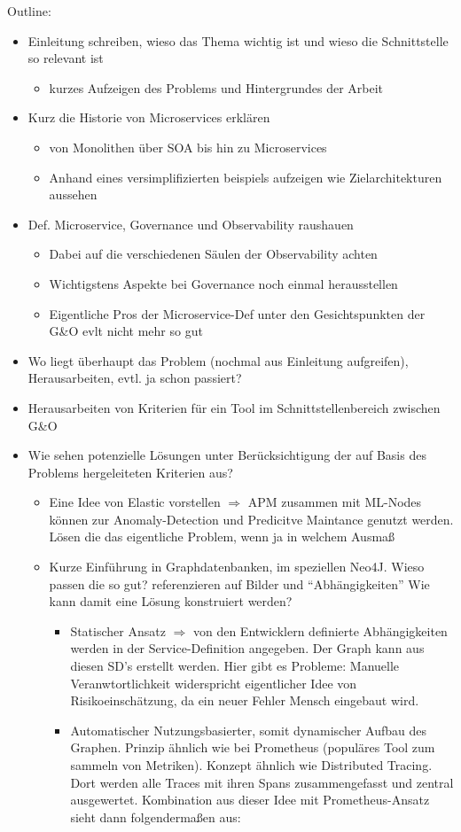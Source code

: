 \documentclass[
	12pt,
	BCOR=5mm,
	DIV=12,
	headinclude=on,
	footinclude=off,
	parskip=half,
	bibliography=totoc,
	listof=entryprefix,
	toc=listof,
	numbers=noenddot,
	plainfootsepline
]{scrreprt}
\begin{document}
Outline:
\begin{itemize}
	\item Einleitung schreiben, wieso das Thema wichtig ist und wieso die Schnittstelle so relevant ist
	\begin{itemize}
		\item kurzes Aufzeigen des Problems und Hintergrundes der Arbeit
	\end{itemize}
	\item Kurz die Historie von Microservices erklären
	\begin{itemize}
		\item von Monolithen über SOA bis hin zu Microservices
		\item Anhand eines versimplifizierten beispiels aufzeigen wie Zielarchitekturen aussehen
	\end{itemize}
	\item Def. Microservice, Governance und Observability raushauen
	\begin{itemize}
		\item Dabei auf die verschiedenen Säulen der Observability achten
		\item Wichtigstens Aspekte bei Governance noch einmal herausstellen
		\item Eigentliche Pros der Microservice-Def unter den Gesichtspunkten der G\&O evlt nicht mehr so gut
	\end{itemize}
	\item Wo liegt überhaupt das Problem (nochmal aus Einleitung aufgreifen), Herausarbeiten, evtl. ja schon passiert?
	\item Herausarbeiten von Kriterien für ein Tool im Schnittstellenbereich zwischen G\&O
	\item Wie sehen potenzielle Lösungen unter Berücksichtigung der auf Basis des Problems hergeleiteten Kriterien aus?
	\begin{itemize}
		\item Eine Idee von Elastic vorstellen $\Rightarrow$ APM zusammen mit ML-Nodes können zur Anomaly-Detection und Predicitve Maintance genutzt werden. Lösen die das eigentliche Problem, wenn ja in welchem Ausmaß
		\item Kurze Einführung in Graphdatenbanken, im speziellen Neo4J. Wieso passen die so gut? referenzieren auf Bilder und \enquote{Abhängigkeiten} Wie kann damit eine Lösung konstruiert werden?
		\begin{itemize}
			\item Statischer Ansatz $\Rightarrow$ von den Entwicklern definierte Abhängigkeiten werden in der Service-Definition angegeben. Der Graph kann aus diesen SD's erstellt werden. Hier gibt es Probleme: Manuelle Veranwtortlichkeit widerspricht eigentlicher Idee von Risikoeinschätzung, da ein neuer Fehler Mensch eingebaut wird.
			\item Automatischer Nutzungsbasierter, somit dynamischer Aufbau des Graphen. Prinzip ähnlich wie bei Prometheus (populäres Tool zum sammeln von Metriken). Konzept ähnlich wie Distributed Tracing. Dort werden alle Traces mit ihren Spans zusammengefasst und zentral ausgewertet. Kombination aus dieser Idee mit Prometheus-Ansatz sieht dann folgendermaßen aus:
			

\end{itemize}
\end{itemize}
\end{itemize}
\end{document}
